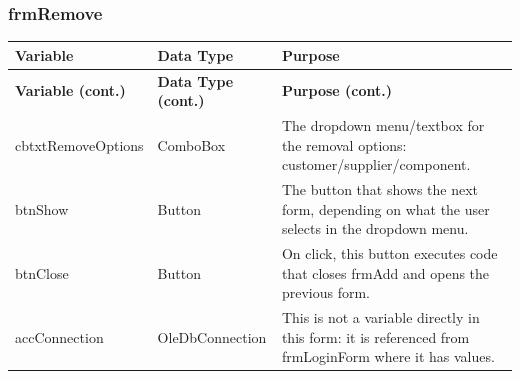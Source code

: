 	\subsubsection{frmRemove}
	\begin{longtable}{| p{4cm} | p{3cm} | p{10cm} |}
		\hline
		\textbf{Variable} & \textbf{Data Type} & \textbf{Purpose}\\
		\endfirsthead
		\hline
		\textbf{Variable (cont.)} & \textbf{Data Type (cont.)} & \textbf{Purpose (cont.)}\\
		\endhead
		\hline
		cbtxtRemoveOptions & ComboBox & The dropdown menu\slash textbox for the removal options: customer\slash supplier\slash component.\\
		\hline
		btnShow & Button & The button that shows the next form, depending on what the user selects in the dropdown menu.\\
		\hline
		btnClose & Button & On click, this button executes code that closes frmAdd and opens the previous form.\\
		\hline
		accConnection & OleDbConnection & This is not a variable directly in this form: it is referenced from frmLoginForm where it has values.\\
		\hline
	\end{longtable}
	
